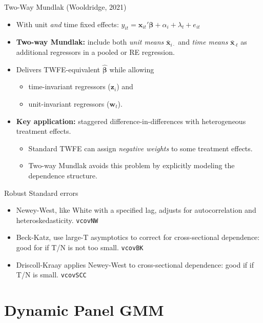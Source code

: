 \documentclass[aspectratio=169, handout, t]{beamer}
\numberwithin{equation}{section}
\begin{document}
\begin{frame}{Two-Way Mundlak (Wooldridge, 2021)}
\begin{itemize}
  \item With unit \emph{and} time fixed effects:
    $y_{it} = \bm{x}_{it}'\bm{\beta} + \alpha_i + \lambda_t + e_{it}$
  \item \textbf{Two-way Mundlak:} include both \emph{unit means} $\bar{\bm{x}}_{i\cdot}$
        and \emph{time means} $\bar{\bm{x}}_{\cdot t}$ as additional regressors
        in a pooled or RE regression.\pause
  \item Delivers TWFE-equivalent $\hat{\bm{\beta}}$ while allowing
    \begin{itemize}
      \item time-invariant regressors ($\bm{z}_i$) and
      \item unit-invariant regressors ($\bm{w}_t$).
    \end{itemize}\pause
  \item \textbf{Key application:} staggered difference-in-differences with
        heterogeneous treatment effects.
    \begin{itemize}
      \item Standard TWFE can assign \emph{negative weights} to some
            treatment effects.
      \item Two-way Mundlak avoids this problem by explicitly modeling the
            dependence structure.
    \end{itemize}
\end{itemize}
\end{frame}

\begin{frame}{Robust Standard errors}
\begin{itemize}
\item Newey-West, like White with a specified lag, adjusts for autocorrelation and heteroskedasticity.  \texttt{vcovNW}
\item Beck-Katz, use large-T asymptotics to correct for cross-sectional dependence: good for if T/N is not too small. \texttt{vcovBK}
\item Driscoll-Kraay applies Newey-West to cross-sectional dependence: good if if T/N is small. \texttt{vcovSCC}
\end{itemize}
\end{frame}

\section{Dynamic Panel GMM}
\end{document}
